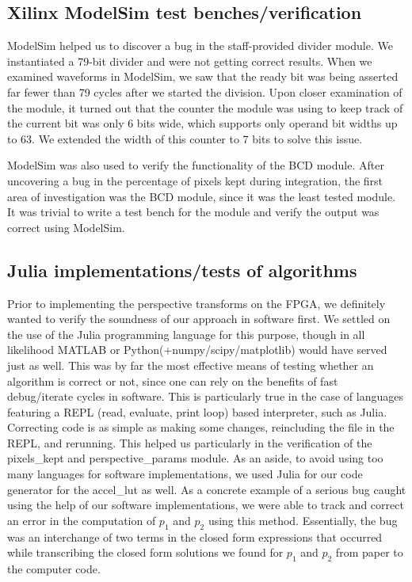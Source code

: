 \documentclass{article}
\begin{document}
\subsection{Xilinx ModelSim test benches/verification}
ModelSim helped us to discover a bug in the staff-provided divider module.
We instantiated a 79-bit divider and were not getting correct results.
When we examined waveforms in ModelSim, we saw that the ready bit was being asserted far fewer than 79 cycles after we started the division.
Upon closer examination of the module, it turned out that the counter the module was using to keep track of the current bit was only 6 bits wide,
which supports only operand bit widths up to 63.
We extended the width of this counter to 7 bits to solve this issue.

ModelSim was also used to verify the functionality of the BCD module.
After uncovering a bug in the percentage of pixels kept during integration, the first area of investigation was the BCD module, since it was the least tested module.
It was trivial to write a test bench for the module and verify the output was correct using ModelSim.

\subsection{Julia implementations/tests of algorithms}
Prior to implementing the perspective transforms on the FPGA,
we definitely wanted to verify the soundness of our approach in software first.
We settled on the use of the Julia programming language for this purpose,
though in all likelihood MATLAB or Python(+numpy/scipy/matplotlib) would have served just as well.
This was by far the most effective means of testing whether an algorithm is correct or not,
since one can rely on the benefits of fast debug/iterate cycles in software.
This is particularly true in the case of languages featuring a REPL (read, evaluate, print loop) based interpreter, such as Julia.
Correcting code is as simple as making some changes, reincluding the file in the REPL, and rerunning.
This helped us particularly in the verification of the pixels\_kept and perspective\_params module.
As an aside, to avoid using too many languages for software implementations,
we used Julia for our code generator for the accel\_lut as well.
As a concrete example of a serious bug caught using the help of our software implementations,
we were able to track and correct an error in the computation of $p_1$ and $p_2$ using this method.
Essentially, the bug was an interchange of two terms in the closed form expressions that occurred
while transcribing the closed form solutions we found for $p_1$ and $p_2$ from paper to the computer code.
\end{document}
